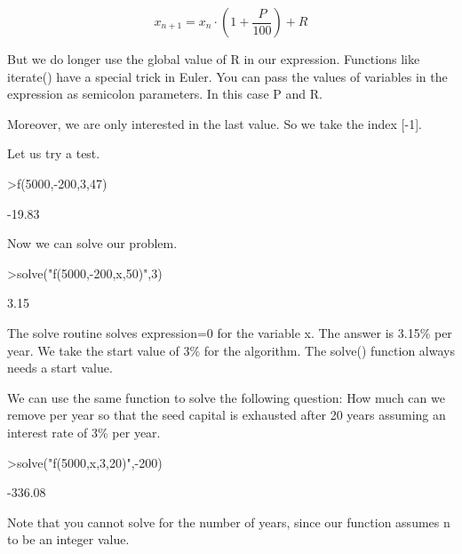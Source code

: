 \documentclass{article}
\begin{document}
\begin{eulernotebook}
\begin{eulercomment}
\begin{eulercomment}
\begin{eulercomment}
\begin{eulercomment}
\begin{eulercomment}
\begin{eulercomment}
\begin{eulercomment}
\begin{eulercomment}
\begin{eulercomment}
\begin{eulercomment}
\begin{eulercomment}
\end{eulercomment}
\begin{eulerformula}
\[
x_{n+1} = x_n \cdot \left(1+ \frac{P}{100}\right) + R
\]
\end{eulerformula}
\begin{eulercomment}
But we do longer use the global value of R in our expression. Functions like
iterate() have a special trick in Euler. You can pass the values of variables
in the expression as semicolon parameters. In this case P and R.

Moreover, we are only interested in the last value. So we take the index
[-1].

Let us try a test.
\end{eulercomment}
\begin{eulerprompt}
>f(5000,-200,3,47)
\end{eulerprompt}
\begin{euleroutput}
       -19.83 
\end{euleroutput}
\begin{eulercomment}
Now we can solve our problem.
\end{eulercomment}
\begin{eulerprompt}
>solve("f(5000,-200,x,50)",3)
\end{eulerprompt}
\begin{euleroutput}
         3.15 
\end{euleroutput}
\begin{eulercomment}
The solve routine solves expression=0 for the variable x. The answer is 3.15\%
per year. We take the start value of 3\% for the algorithm. The solve()
function always needs a start value.

We can use the same function to solve the following question: How much can we
remove per year so that the seed capital is exhausted after 20 years assuming
an interest rate of 3\% per year.
\end{eulercomment}
\begin{eulerprompt}
>solve("f(5000,x,3,20)",-200)
\end{eulerprompt}
\begin{euleroutput}
      -336.08 
\end{euleroutput}
\begin{eulercomment}
Note that you cannot solve for the number of years, since our function
assumes n to be an integer value.


\end{eulercomment}
\end{eulercomment}
\end{eulercomment}
\end{eulercomment}
\end{eulercomment}
\end{eulercomment}
\end{eulercomment}
\end{eulercomment}
\end{eulercomment}
\end{eulercomment}
\end{eulercomment}
\end{eulernotebook}
\end{document}

